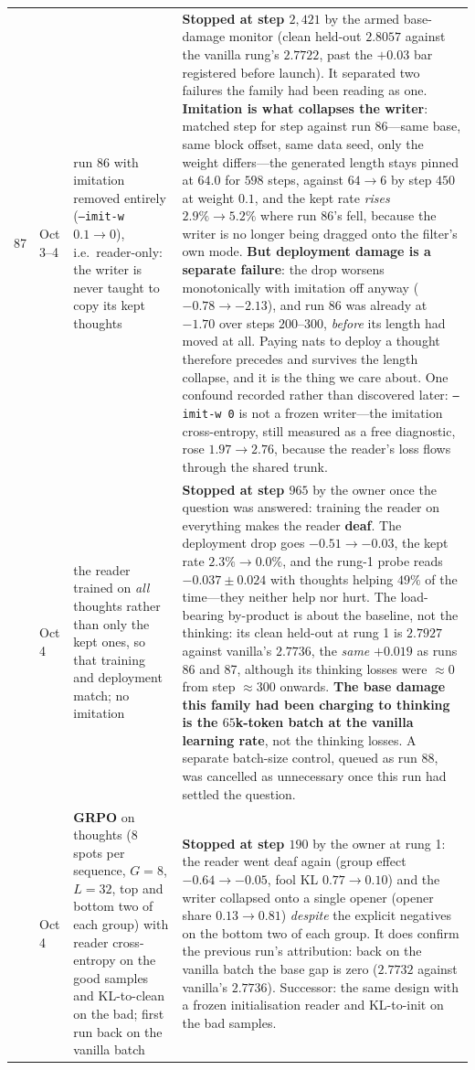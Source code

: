 \documentclass{article} %
\begin{document}
{\begin{longtable}{@{}llp{3.6cm}p{5.6cm}@{}}
87 & Oct 3--4 & run 86 with imitation removed entirely (\texttt{--imit-w} $0.1 \to 0$), i.e.\ reader-only: the writer is never taught to copy its kept thoughts & \textbf{Stopped at step $2{,}421$} by the armed base-damage monitor (clean held-out $2.8057$ against the vanilla rung's $2.7722$, past the $+0.03$ bar registered before launch). It separated two failures the family had been reading as one. \textbf{Imitation is what collapses the writer}: matched step for step against run 86---same base, same block offset, same data seed, only the weight differs---the generated length stays pinned at $64.0$ for $598$ steps, against $64 \to 6$ by step $450$ at weight $0.1$, and the kept rate \emph{rises} $2.9\% \to 5.2\%$ where run 86's fell, because the writer is no longer being dragged onto the filter's own mode. \textbf{But deployment damage is a separate failure}: the drop worsens monotonically with imitation off anyway ($-0.78 \to -2.13$), and run 86 was already at $-1.70$ over steps $200$--$300$, \emph{before} its length had moved at all. Paying nats to deploy a thought therefore precedes and survives the length collapse, and it is the thing we care about. One confound recorded rather than discovered later: \texttt{--imit-w 0} is not a frozen writer---the imitation cross-entropy, still measured as a free diagnostic, rose $1.97 \to 2.76$, because the reader's loss flows through the shared trunk. \\
\addlinespace
88 & Oct 4 & the reader trained on \emph{all} thoughts rather than only the kept ones, so that training and deployment match; no imitation & \textbf{Stopped at step $965$} by the owner once the question was answered: training the reader on everything makes the reader \textbf{deaf}. The deployment drop goes $-0.51 \to -0.03$, the kept rate $2.3\% \to 0.0\%$, and the rung-1 probe reads $-0.037 \pm 0.024$ with thoughts helping $49\%$ of the time---they neither help nor hurt. The load-bearing by-product is about the baseline, not the thinking: its clean held-out at rung 1 is $2.7927$ against vanilla's $2.7736$, the \emph{same} $+0.019$ as runs 86 and 87, although its thinking losses were ${\approx}0$ from step ${\approx}300$ onwards. \textbf{The base damage this family had been charging to thinking is the $65$k-token batch at the vanilla learning rate}, not the thinking losses. A separate batch-size control, queued as run 88, was cancelled as unnecessary once this run had settled the question. \\
\addlinespace
89 & Oct 4 & \textbf{GRPO} on thoughts ($8$ spots per sequence, $G=8$, $L=32$, top and bottom two of each group) with reader cross-entropy on the good samples and KL-to-clean on the bad; first run back on the vanilla batch & \textbf{Stopped at step $190$} by the owner at rung 1: the reader went deaf again (group effect $-0.64 \to -0.05$, fool KL $0.77 \to 0.10$) and the writer collapsed onto a single opener (opener share $0.13 \to 0.81$) \emph{despite} the explicit negatives on the bottom two of each group. It does confirm the previous run's attribution: back on the vanilla batch the base gap is zero ($2.7732$ against vanilla's $2.7736$). Successor: the same design with a frozen initialisation reader and KL-to-init on the bad samples. \\

\end{longtable}}
\end{document}
